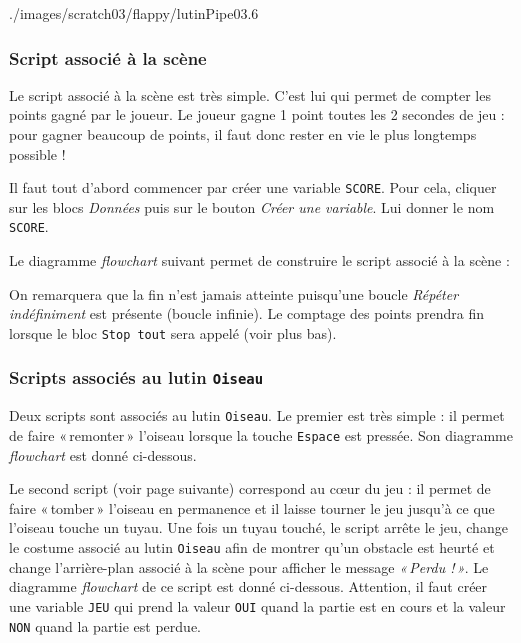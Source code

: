 %
	      {./images/scratch03/flappy/lutinPipe03}{.6\textwidth}

 





\subsubsection{Script associé à la scène}

Le script associé à la scène est très simple. C'est lui qui permet de compter les points gagné par le joueur. Le joueur gagne 1 point toutes les 2 secondes de jeu : pour gagner beaucoup de points, il faut donc rester en vie le plus longtemps possible !

\vspace{6pt}

Il faut tout d'abord commencer par créer une variable \texttt{SCORE}. Pour cela, cliquer sur les blocs \emph{Données} puis sur le bouton \emph{Créer une variable}. Lui donner le nom \texttt{SCORE}.

Le diagramme \emph{flowchart} suivant permet de construire le script associé à la scène :



On remarquera que la fin n'est jamais atteinte puisqu'une boucle \emph{Répéter indéfiniment} est présente (boucle infinie). Le comptage des points prendra fin lorsque le bloc \texttt{Stop tout} sera appelé (voir plus bas).





\subsubsection{Scripts associés au lutin \texttt{Oiseau}}

Deux scripts sont associés au lutin \texttt{Oiseau}. Le premier est très simple : il permet de faire «\,remonter\,» l'oiseau lorsque la touche \texttt{Espace} est pressée. Son diagramme \emph{flowchart} est donné ci-dessous.


\vspace{3cm}

Le second script (voir page suivante) correspond au cœur du jeu : il permet de faire «\,tomber\,» l'oiseau en permanence et il laisse tourner le jeu jusqu'à ce que l'oiseau touche un tuyau. Une fois un tuyau touché, le script arrête le jeu, change le costume associé au lutin \texttt{Oiseau} afin de montrer qu'un obstacle est heurté et change l'arrière-plan associé à la scène pour afficher le message \emph{«\,Perdu !\,»}. Le diagramme \emph{flowchart} de ce script est donné ci-dessous. Attention, il faut créer une variable \texttt{JEU} qui prend la valeur \texttt{OUI} quand la partie est en cours et la valeur \texttt{NON} quand la partie est perdue.


